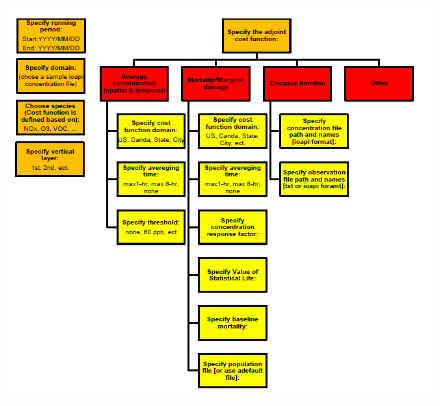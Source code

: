 \documentclass{article}
\begin{document}
\begin{figure}
	\centering
	\includegraphics{Forcing-Interface-Chart.png}
\end{figure}
\end{document}
